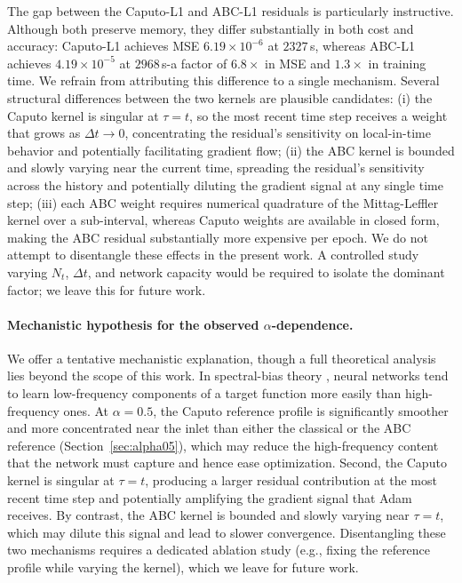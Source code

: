 \documentclass[11pt]{article}
\begin{document}
The gap between the Caputo-L1 and ABC-L1 residuals is particularly
instructive. Although both preserve memory, they differ substantially in
both cost and accuracy: Caputo-L1 achieves MSE \(6.19\times 10^{-6}\) at
\(2327\)\,s, whereas ABC-L1 achieves \(4.19\times 10^{-5}\) at
\(2968\)\,s-a factor of \(6.8\times\) in MSE and \(1.3\times\) in
training time. We refrain from attributing this difference to a single
mechanism. Several structural differences between the two kernels are
plausible candidates: (i) the Caputo kernel is singular at \(\tau=t\),
so the most recent time step receives a weight that grows as
\(\Delta t\to 0\), concentrating the residual's sensitivity on
local-in-time behavior and potentially facilitating gradient flow;
(ii) the ABC kernel is bounded and slowly varying near the current time,
spreading the residual's sensitivity across the history and potentially
diluting the gradient signal at any single time step; (iii) each ABC
weight requires numerical quadrature of the Mittag-Leffler kernel over
a sub-interval, whereas Caputo weights are available in closed form,
making the ABC residual substantially more expensive per epoch. We do
not attempt to disentangle these effects in the present work. A
controlled study varying \(N_t\), \(\Delta t\), and network capacity
would be required to isolate the dominant factor; we leave this for
future work.

\paragraph{Mechanistic hypothesis for the observed \(\alpha\)-dependence.}
We offer a tentative mechanistic explanation, though a full theoretical
analysis lies beyond the scope of this work. In spectral-bias theory
\cite{Rahaman2019, Wang2021}, neural networks tend to learn low-frequency
components of a target function more easily than high-frequency ones.
At \(\alpha=0.5\), the Caputo reference profile is significantly smoother
and more concentrated near the inlet than either the classical or the
ABC reference (Section~\ref{sec:alpha05}), which may reduce the
high-frequency content that the network must capture and hence ease
optimization. Second, the Caputo kernel is singular at \(\tau=t\),
producing a larger residual contribution at the most recent time step
and potentially amplifying the gradient signal that Adam receives.
By contrast, the ABC kernel is bounded and slowly varying near
\(\tau=t\), which may dilute this signal and lead to slower convergence.
Disentangling these two mechanisms requires a dedicated ablation study
(e.g., fixing the reference profile while varying the kernel), which we
leave for future work.
\end{document}
